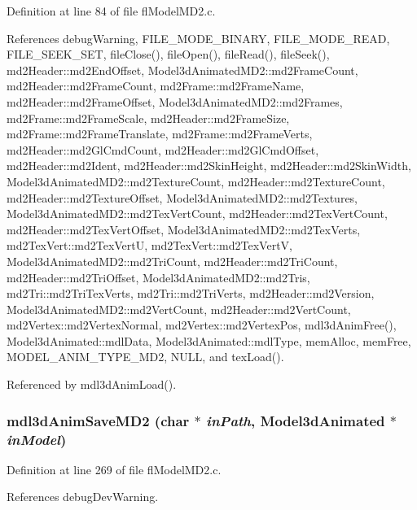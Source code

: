 Definition at line 84 of file fl\-Model\-MD2.c.

References debug\-Warning, FILE\_\-MODE\_\-BINARY, FILE\_\-MODE\_\-READ, FILE\_\-SEEK\_\-SET, file\-Close(), file\-Open(), file\-Read(), file\-Seek(), md2Header::md2End\-Offset, Model3d\-Animated\-MD2::md2Frame\-Count, md2Header::md2Frame\-Count, md2Frame::md2Frame\-Name, md2Header::md2Frame\-Offset, Model3d\-Animated\-MD2::md2Frames, md2Frame::md2Frame\-Scale, md2Header::md2Frame\-Size, md2Frame::md2Frame\-Translate, md2Frame::md2Frame\-Verts, md2Header::md2Gl\-Cmd\-Count, md2Header::md2Gl\-Cmd\-Offset, md2Header::md2Ident, md2Header::md2Skin\-Height, md2Header::md2Skin\-Width, Model3d\-Animated\-MD2::md2Texture\-Count, md2Header::md2Texture\-Count, md2Header::md2Texture\-Offset, Model3d\-Animated\-MD2::md2Textures, Model3d\-Animated\-MD2::md2Tex\-Vert\-Count, md2Header::md2Tex\-Vert\-Count, md2Header::md2Tex\-Vert\-Offset, Model3d\-Animated\-MD2::md2Tex\-Verts, md2Tex\-Vert::md2Tex\-Vert\-U, md2Tex\-Vert::md2Tex\-Vert\-V, Model3d\-Animated\-MD2::md2Tri\-Count, md2Header::md2Tri\-Count, md2Header::md2Tri\-Offset, Model3d\-Animated\-MD2::md2Tris, md2Tri::md2Tri\-Tex\-Verts, md2Tri::md2Tri\-Verts, md2Header::md2Version, Model3d\-Animated\-MD2::md2Vert\-Count, md2Header::md2Vert\-Count, md2Vertex::md2Vertex\-Normal, md2Vertex::md2Vertex\-Pos, mdl3d\-Anim\-Free(), Model3d\-Animated::mdl\-Data, Model3d\-Animated::mdl\-Type, mem\-Alloc, mem\-Free, MODEL\_\-ANIM\_\-TYPE\_\-MD2, NULL, and tex\-Load().

Referenced by mdl3d\-Anim\-Load().
\subsubsection{ mdl3d\-Anim\-Save\-MD2 (char $\ast$ {\em in\-Path}, {\bf Model3d\-Animated} $\ast$ {\em in\-Model})}\label{flModelMD2_8h_ea2d3e833bd2cf5916d1747a53e16012}




Definition at line 269 of file fl\-Model\-MD2.c.

References debug\-Dev\-Warning.